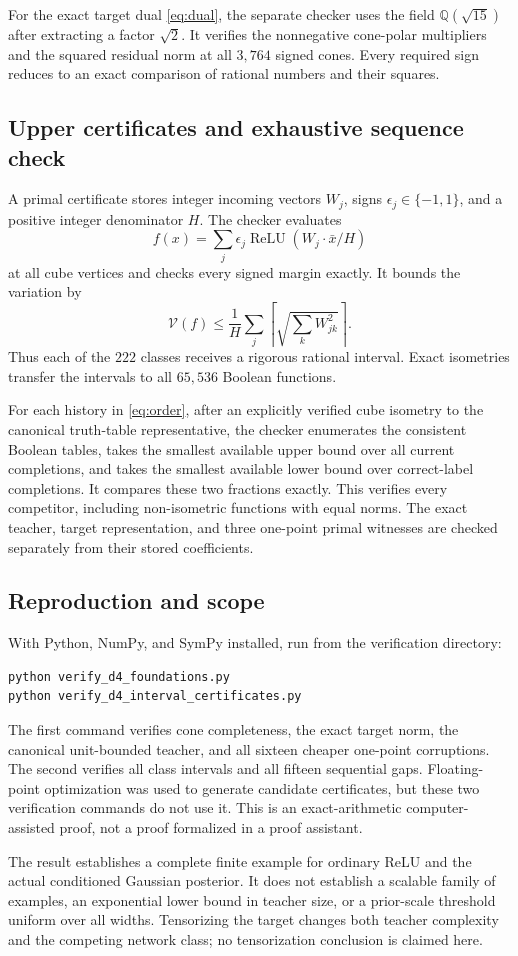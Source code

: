 \documentclass[11pt]{article}
\theoremstyle{remark}\newtheorem{remark}[theorem]{Remark}
\newcommand{\relu}{\operatorname{ReLU}}
\newcommand{\V}{\mathcal V}
\newcommand{\1}{\mathbf 1}
\begin{document}
For the exact target dual \eqref{eq:dual}, the separate checker uses the field $\mathbb Q(\sqrt{15})$ after extracting a factor $\sqrt2$. It verifies the nonnegative cone-polar multipliers and the squared residual norm at all $3{,}764$ signed cones. Every required sign reduces to an exact comparison of rational numbers and their squares.

\subsection{Upper certificates and exhaustive sequence check}
A primal certificate stores integer incoming vectors $W_j$, signs $\epsilon_j\in\{-1,1\}$, and a positive integer denominator $H$. The checker evaluates
\[
f(x)=\sum_j\epsilon_j\relu(W_j\cdot\bar x/H)
\]
at all cube vertices and checks every signed margin exactly. It bounds the variation by
\[
\V(f)\le\frac1H\sum_j\left\lceil\sqrt{\sum_k W_{jk}^2}\right\rceil.
\tag{16}\label{eq:upper}
\]
Thus each of the $222$ classes receives a rigorous rational interval. Exact isometries transfer the intervals to all $65{,}536$ Boolean functions.

For each history in \eqref{eq:order}, after an explicitly verified cube isometry to the canonical truth-table representative, the checker enumerates the consistent Boolean tables, takes the smallest available upper bound over all current completions, and takes the smallest available lower bound over correct-label completions. It compares these two fractions exactly. This verifies every competitor, including non-isometric functions with equal norms. The exact teacher, target representation, and three one-point primal witnesses are checked separately from their stored coefficients.

\subsection{Reproduction and scope}
With Python, NumPy, and SymPy installed, run from the verification directory:
\begin{verbatim}
python verify_d4_foundations.py
python verify_d4_interval_certificates.py
\end{verbatim}
The first command verifies cone completeness, the exact target norm, the canonical unit-bounded teacher, and all sixteen cheaper one-point corruptions. The second verifies all class intervals and all fifteen sequential gaps. Floating-point optimization was used to generate candidate certificates, but these two verification commands do not use it. This is an exact-arithmetic computer-assisted proof, not a proof formalized in a proof assistant.

The result establishes a complete finite example for ordinary ReLU and the actual conditioned Gaussian posterior. It does not establish a scalable family of examples, an exponential lower bound in teacher size, or a prior-scale threshold uniform over all widths. Tensorizing the target changes both teacher complexity and the competing network class; no tensorization conclusion is claimed here.
\end{document}
